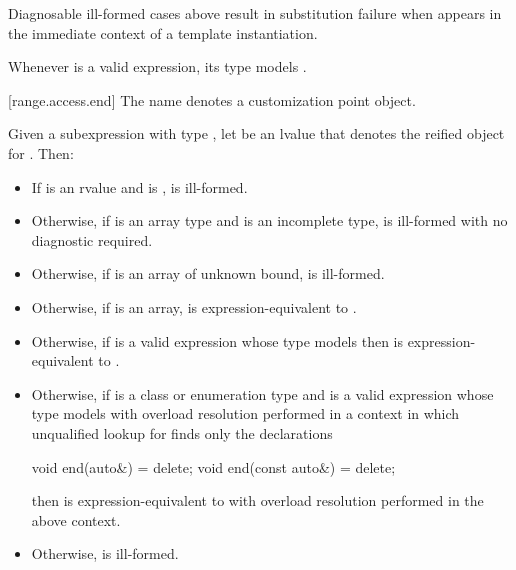 \pnum
\begin{note}
Diagnosable ill-formed cases above
result in substitution failure when 
appears in the immediate context of a template instantiation.
\end{note}

\pnum
\begin{note}
Whenever  is a valid expression, its type models
.
\end{note}

[range.access.end]{}
\pnum
The name  denotes a customization point
object.

\pnum
Given a subexpression  with type ,
let  be an lvalue that denotes the reified object for .
Then:

\begin{itemize}
\item
  If  is an rvalue and
   is ,
   is ill-formed.

\item
  Otherwise, if  is an array type and
   is an incomplete type,
   is ill-formed with no diagnostic required.

\item
  Otherwise, if  is an array of unknown bound,
   is ill-formed.

\item
  Otherwise, if  is an array,
   is expression-equivalent to
  .

\item
  Otherwise, if 
  is a valid expression whose type models
  then  is expression-equivalent to
  .

\item
  Otherwise, if  is a class or enumeration type and
  is a valid expression whose type models
  with overload resolution performed in a context in which
  unqualified lookup for  finds only the declarations
\begin{codeblock}
void end(auto&) = delete;
void end(const auto&) = delete;
\end{codeblock}
  then  is expression-equivalent to
  with overload resolution performed in the above context.

\item
  Otherwise,  is ill-formed.
\end{itemize}

